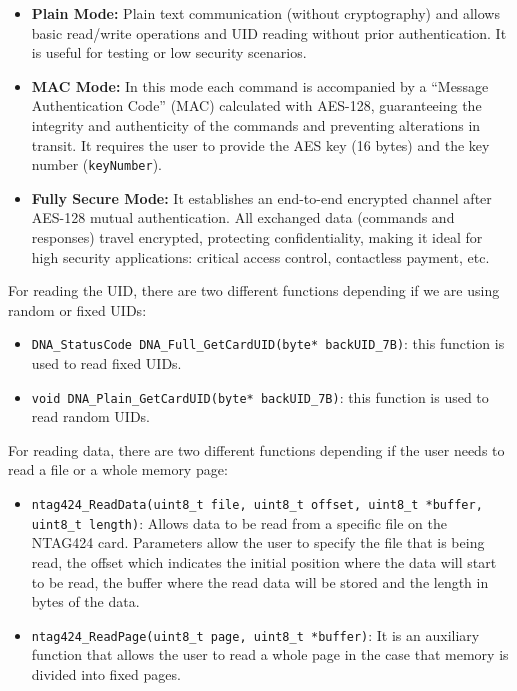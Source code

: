 \begin{itemize}
	\item \textbf{Plain Mode:} Plain text communication (without cryptography) and allows basic read/write operations and UID reading without prior authentication. It is useful for testing or low security scenarios.
	
	\item \textbf{MAC Mode:} In this mode each command is accompanied by a ``Message Authentication Code'' (MAC) calculated with AES-128, guaranteeing the integrity and authenticity of the commands and preventing alterations in transit. It requires the user to provide the AES key (16 bytes) and the key number (\texttt{keyNumber}).
	
	\item \textbf{Fully Secure Mode:} It establishes an end-to-end encrypted channel after AES-128 mutual authentication. All exchanged data (commands and responses) travel encrypted, protecting confidentiality, making it ideal for high security applications: critical access control, contactless payment, etc.
\end{itemize}

For reading the UID, there are two different functions depending if we are using random or fixed UIDs:

\begin{itemize}
	\item \texttt{DNA\_StatusCode DNA\_Full\_GetCardUID(byte* backUID\_7B)}: this function is used to read fixed UIDs.
	\item \texttt{void DNA\_Plain\_GetCardUID(byte* backUID\_7B)}: this function is used to read random UIDs.
\end{itemize}

For reading data, there are two different functions depending if the user needs to read a file or a whole memory page:

\begin{itemize}
	\item \texttt{ntag424\_ReadData(uint8\_t file, uint8\_t offset, uint8\_t *buffer, uint8\_t length)}: Allows data to be read from a specific file on the NTAG424 card. Parameters allow the user to specify the file that is being read, the offset which indicates the initial position where the data will start to be read, the buffer where the read data will be stored and the length in bytes of the data.
	
	\item \texttt{ntag424\_ReadPage(uint8\_t page, uint8\_t *buffer)}: It is an auxiliary function that allows the user to read a whole page in the case that memory is divided into fixed pages.
\end{itemize}

